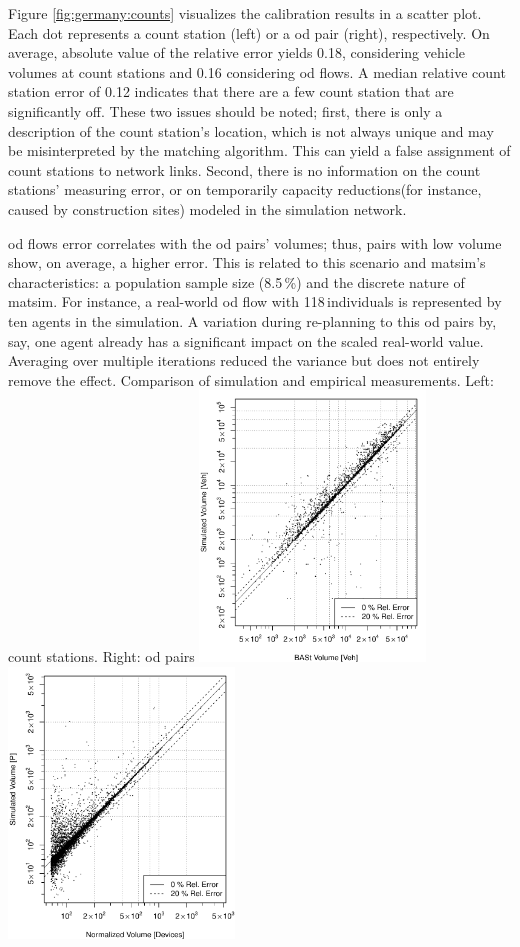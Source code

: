 Figure \ref{fig:germany:counts} visualizes the calibration results in a scatter plot. Each dot represents a count station (left) or a \gls{od} pair (right), respectively. On average, absolute value of the relative error yields 0.18, considering vehicle volumes at count stations and 0.16 considering \gls{od} flows. A median relative count station error of 0.12 indicates that there are a few count station that are significantly off. These two issues should be noted; first, there is only a description of the count station's location, which is not always unique and may be misinterpreted by the matching algorithm. This can yield a false assignment of count stations to network links. Second, there is no information on the count stations' measuring error, or on temporarily capacity reductions(for instance, caused by construction sites) modeled in the simulation network.

 \gls{od} flows error correlates with the \gls{od} pairs' volumes; thus, pairs with low volume show, on average, a higher error. This is related to this scenario and \gls{matsim}'s characteristics: a population sample size (8.5\,\%) and the discrete nature of \gls{matsim}. For instance, a real-world \gls{od} flow with 118\,individuals is  represented by ten agents in the simulation. A variation during re-planning to this \gls{od} pairs by, say, one agent already has a significant impact on the scaled real-world value. Averaging over multiple iterations reduced the variance but does not entirely remove the effect.
\createfigure%
{}%
{Comparison of simulation and empirical measurements. Left: count stations. Right: \gls{od} pairs}%
{\label{fig:germany:counts}}%
{\includegraphics[width=0.45\textwidth, angle=0]{./scenarios/figures/germany-counts}\includegraphics[width=0.45\textwidth, angle=0]{./scenarios/figures/germany-odcounts}}%
{}



